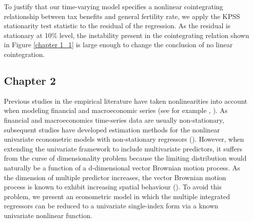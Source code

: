 \documentclass[a4paper,12pt,times,numbered,print,index]{report}
\numberwithin{equation}{section}
\begin{document}
	To justify that our time-varying model specifies a nonlinear cointegrating relationship between tax benefits and general fertility rate, we apply the KPSS stationarity test statistic to the residual of the regression. As the residual is stationary at 10\% level, the instability present in the cointegrating relation shown in Figure \ref{chapter 1_1} is large enough to change the conclusion of no linear cointegration. 
	
	
	
	\subsection*{Chapter 2}
	
	Previous studies in the empirical literature have taken nonlinearities into account when modeling financial and macroeconomic series (see for example \cite{lettau2008reconciling}, \cite{qi1999nonlinear}). As financial and macroeconomics time-series data are usually non-stationary, subsequent studies have developed estimation methods for the nonlinear univariate econometric models with non-stationary regressors (\cite{park1999asymptotics,park2000nonstationary,park2001nonlinear}).
	However, when extending the univariate framework to include multivariate predictors, it suffers from the curse of dimensionality
	problem because the limiting distribution would naturally be a function of a d-dimensional vector Brownian motion process. As the dimension of multiple predictor increases, the vector Brownian motion process is known to exhibit increasing spatial
	behaviour (\cite{revuz2013continuous}). To avoid this problem, we present an econometric model in which the multiple integrated regressors can be reduced to a univariate single-index form via a known univariate nonlinear function.
	
\end{document}
